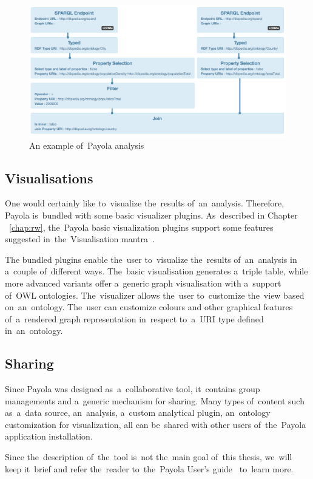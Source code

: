 \begin{figure}
	\centering
	\includegraphics[width=150mm]{images/example-analysis.png}
	\caption{An example of~Payola analysis}
	\label{fig:example-analysis}
\end{figure}

\subsection{Visualisations}
One would certainly like to~visualize the~results of~an~analysis. Therefore, 
Payola is~bundled with some basic visualizer plugins. As~described
in Chapter ~\ref{chap:rw}, the~Payola basic visualization 
plugins support some features suggested in~the~Visualisation 
mantra~\cite{mantra}.

The bundled plugins enable the~user to~visualize the~results of~an~analysis 
in a~couple of~different ways. The~basic visualisation generates a~triple 
table, while more advanced variants offer a~generic graph visualisation with a~support of~OWL ontologies. The~visualizer allows the~user to~customize the~view based on~an~ontology. The~user can customize colours and other graphical 
features of~a~rendered graph representation in~respect to~a~URI type defined in~an~ontology.

\subsection{Sharing}
Since Payola was designed as~a~collaborative tool, it~contains group 
managements and a~generic mechanism for sharing. Many types of~content such as~a~data source, an~analysis, a~custom analytical plugin, an~ontology customization for 
visualization, all can be~shared with other users of~the~Payola application 
installation.

Since the~description of~the~tool is~not the~main goal of~this thesis, we~will 
keep it~brief and refer the~reader to~the~Payola User's guide~\cite{payola:ug} to~learn more.

